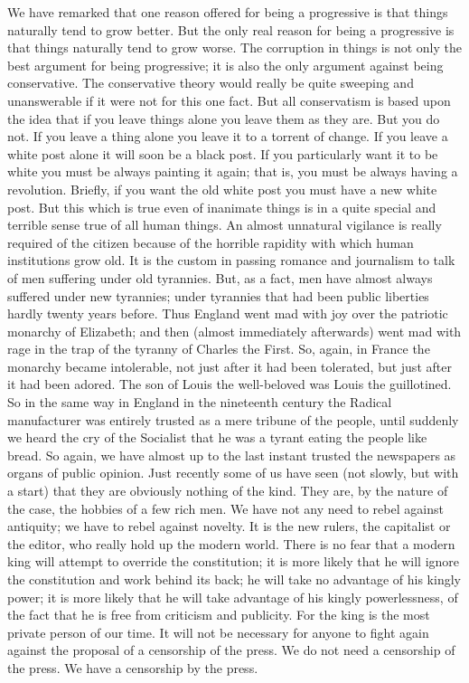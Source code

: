 \documentclass{book}
\begin{document}
We have remarked that one reason offered for being a progressive is that things naturally tend to grow better. But the only real reason for being a progressive is that things naturally tend to grow worse. The corruption in things is not only the best argument for being progressive; it is also the only argument against being conservative. The conservative theory would really be quite sweeping and unanswerable if it were not for this one fact. But all conservatism is based upon the idea that if you leave things alone you leave them as they are. But you do not. If you leave a thing alone you leave it to a torrent of change. If you leave a white post alone it will soon be a black post. If you particularly want it to be white you must be always painting it again; that is, you must be always having a revolution. Briefly, if you want the old white post you must have a new white post. But this which is true even of inanimate things is in a quite special and terrible sense true of all human things. An almost unnatural vigilance is really required of the citizen because of the horrible rapidity with which human institutions grow old. It is the custom in passing romance and journalism to talk of men suffering under old tyrannies. But, as a fact, men have almost always suffered under new tyrannies; under tyrannies that had been public liberties hardly twenty years before. Thus England went mad with joy over the patriotic monarchy of Elizabeth; and then (almost immediately afterwards) went mad with rage in the trap of the tyranny of Charles the First. So, again, in France the monarchy became intolerable, not just after it had been tolerated, but just after it had been adored. The son of Louis the well-beloved was Louis the guillotined. So in the same way in England in the nineteenth century the Radical manufacturer was entirely trusted as a mere tribune of the people, until suddenly we heard the cry of the Socialist that he was a tyrant eating the people like bread. So again, we have almost up to the last instant trusted the newspapers as organs of public opinion. Just recently some of us have seen (not slowly, but with a start) that they are obviously nothing of the kind. They are, by the nature of the case, the hobbies of a few rich men. We have not any need to rebel against antiquity; we have to rebel against novelty. It is the new rulers, the capitalist or the editor, who really hold up the modern world. There is no fear that a modern king will attempt to override the constitution; it is more likely that he will ignore the constitution and work behind its back; he will take no advantage of his kingly power; it is more likely that he will take advantage of his kingly powerlessness, of the fact that he is free from criticism and publicity. For the king is the most private person of our time. It will not be necessary for anyone to fight again against the proposal of a censorship of the press. We do not need a censorship of the press. We have a censorship by the press.
\end{document}
